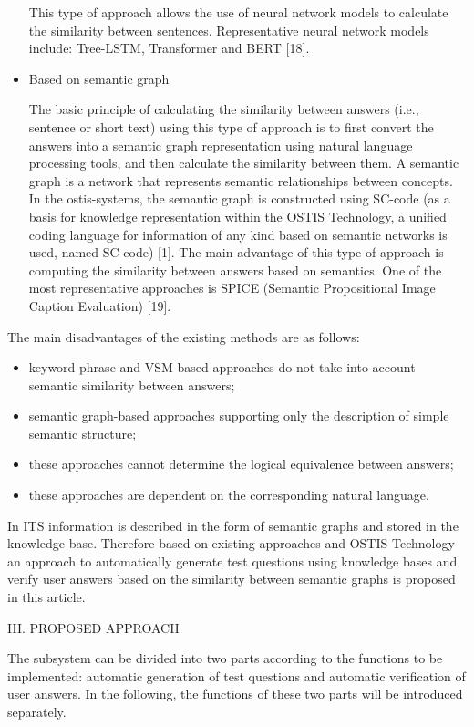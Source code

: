 \documentclass{article}
\begin{document}
\begin{multicols}{2}
\begin{itemize}
        This type of approach allows the use of neural network models to calculate the similarity between sentences. Representative neural network models include: Tree-LSTM, Transformer and BERT [18].
        \item Based on semantic graph
    
        The basic principle of calculating the similarity  between answers (i.e., sentence or short text) using this type of approach is to first convert the answers into a semantic graph representation using natural language processing tools, and then calculate the similarity between them. A semantic graph is a network that represents semantic relationships between concepts. In the ostis-systems, the semantic graph is constructed using SC-code (as a basis for knowledge representation within the OSTIS Technology, a unified coding language for information of any kind based on semantic networks is used, named SC-code) [1]. The main advantage of this type of approach is computing the similarity between answers based on semantics. One of the most representative approaches is SPICE (Semantic Propositional Image Caption Evaluation) [19].
    \end{itemize}

The main disadvantages of the existing methods are as
follows:
    \begin{itemize}
        \item keyword phrase and VSM based approaches do not take into account semantic similarity between answers;
        \item semantic graph-based approaches supporting only the description of simple semantic structure;
        \item these approaches cannot determine the logical equivalence between answers;
        \item these approaches are dependent on the corresponding natural language.
    \end{itemize}

In ITS information is described in the form of semantic
graphs and stored in the knowledge base. Therefore
based on existing approaches and OSTIS Technology an
approach to automatically generate test questions using
knowledge bases and verify user answers based on the
similarity between semantic graphs is proposed in this
article.

\begin{center}
    III. PROPOSED APPROACH
\end{center} 

The subsystem can be divided into two parts according
to the functions to be implemented: automatic generation
of test questions and automatic verification of user
answers. In the following, the functions of these two
parts will be introduced separately.


\end{multicols}
\end{document}
